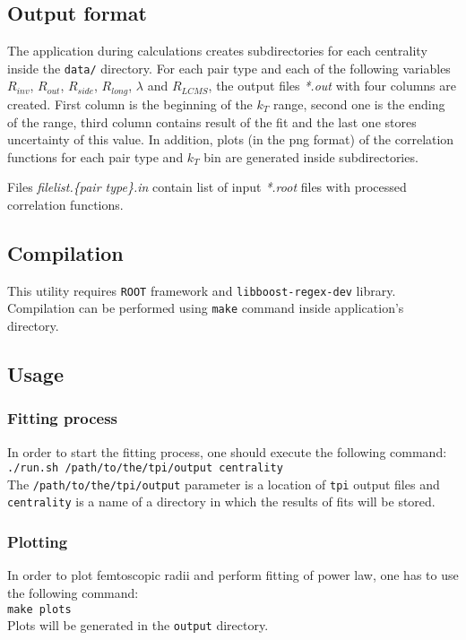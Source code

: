     \subsection{Output format}
      The application during calculations creates subdirectories for each centrality inside the \verb|data/| directory.
      For each pair type and each of the following variables $R_{inv}$, $R_{out}$, $R_{side}$, $R_{long}$, $\lambda$ and $R_{LCMS}$, the output files \textit{*.out} with four columns are created.
      First column is the beginning of the $k_T$ range, second one is the ending of the range, third column contains result of the fit and the last one stores uncertainty of this value.
      In addition, plots (in the png format) of the correlation functions for each pair type and $k_T$ bin are generated inside subdirectories.

      Files \textit{filelist.\{pair type\}.in} contain list of input \textit{*.root} files with processed correlation functions.
    \subsection{Compilation}
      This utility requires \verb|ROOT| framework and \verb|libboost-regex-dev| library.
      Compilation can be performed using \verb|make| command inside application's directory.
    \subsection{Usage}
      \subsubsection{Fitting process}
        In order to start the fitting process, one should execute the following command:\\
        \verb|./run.sh /path/to/the/tpi/output centrality|\\
        The \verb|/path/to/the/tpi/output| parameter is a location of \verb|tpi| output files and \verb|centrality| is a name of a directory in which the results of fits will be stored.
      \subsubsection{Plotting}
        In order to plot femtoscopic radii and perform fitting of power law, one has to use the following command:\\
        \verb|make plots|\\
        Plots will be generated in the \verb|output| directory.

